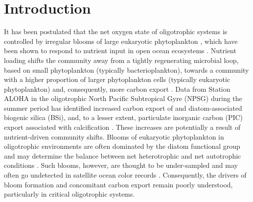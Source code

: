 \section{Introduction}
It has been postulated that the net oxygen state of oligotrophic systems is controlled by irregular blooms of large eukaryotic phytoplankton \citep{Karl2003}, which have been shown to respond to nutrient input in open ocean ecosystems \citep{McAndrew2007}. Nutrient loading shifts the community away from a tightly regenerating microbial loop, based on small phytoplankton (typically bacterioplankton), towards a community with a higher proportion of larger phytoplankton cells (typically eukaryotic phytoplankton) and, consequently, more carbon export \citep{McAndrew2007}. Data from Station ALOHA in the oligotrophic North Pacific Subtropical Gyre (NPSG) during the summer period has identified increased carbon export of and diatom-associated biogenic silica (BSi), and, to a lesser extent, particulate inorganic carbon (PIC) export associated with calcification \citep{Karl2012}. These increases are potentially a result of nutrient-driven community shifts. Blooms of eukaryotic phytoplankton in oligotrophic environments are often dominated by the diatom functional group \citep{Villareal2012} and may determine the balance between net heterotrophic and net autotrophic conditions \citep{Karl2003}. Such blooms, however, are thought to be under-sampled and may often go undetected in satellite ocean color records \citep{Villareal2011}. Consequently, the drivers of bloom formation and concomitant carbon export remain poorly understood, particularly in critical oligotrophic systems. \par 
